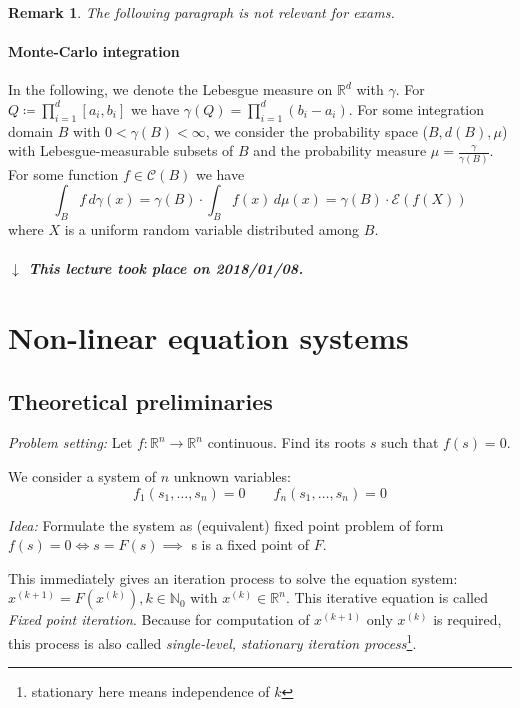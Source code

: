 \documentclass[a4paper]{article}
\numberwithin{lecref}{section}
\theoremstyle{break}
\newtheorem*{Remark}{Remark}
\newcommand{\dateref}[1]{%
  \begin{mdframed}[backgroundcolor=gray!10,innerbottommargin=0pt,innertopmargin=0pt]
    \paragraph{\textit{$\downarrow$ This lecture took place on #1.}}%
  \end{mdframed}%
}
\begin{document}
\begin{Remark}
  The following paragraph is not relevant for exams.
\end{Remark}

\paragraph{Monte-Carlo integration}

In the following, we denote the Lebesgue measure on $\mathbb R^d$ with $\gamma$.
For $Q \coloneqq \prod_{i=1}^d [a_i, b_i]$ we have $\gamma(Q) = \prod_{i=1}^{d} (b_i - a_i)$.
For some integration domain $B$ with $0 < \gamma(B) < \infty$, we consider the probability space ($B, d(B), \mu$) with Lebesgue-measurable subsets of $B$ and the probability measure $\mu = \frac{\gamma}{\gamma(B)}$. For some function $f \in \mathcal C(B)$ we have
\[ \int_B f \, d\gamma(x) = \gamma(B) \cdot \int_B f(x) \, d\mu(x) = \gamma(B) \cdot \mathcal E(f(X)) \]
where $X$ is a uniform random variable distributed among $B$.

\dateref{2018/01/08}

\section{Non-linear equation systems}

\subsection{Theoretical preliminaries}

\emph{Problem setting:} Let $f: \mathbb R^n \to \mathbb R^n$ continuous. Find its roots $s$ such that $f(s) = 0$.

We consider a system of $n$ unknown variables:
\[ f_1(s_1, \dots, s_n) = 0 \qquad f_n(s_1, \dots, s_n) = 0 \]

\emph{Idea:} Formulate the system as (equivalent) fixed point problem of form $f(s) = 0 \iff s = F(s) \implies$ s is a fixed point of $F$.

This immediately gives an iteration process to solve the equation system:
$x^{(k + 1)} = F(x^{(k)}), k \in \mathbb N_0$ with $x^{(k)} \in \mathbb R^n$.
This iterative equation is called \emph{Fixed point iteration}.
Because for computation of $x^{(k+1)}$ only $x^{(k)}$ is required,
this process is also called \emph{single-level, stationary iteration process}\footnote{stationary here means independence of $k$}.
\end{document}
